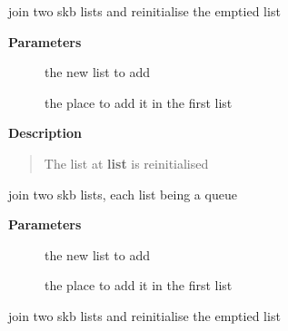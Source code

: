 \documentclass[a4paper,8pt,english]{sphinxmanual}
\begin{document}
\begin{fulllineitems}
\label{networking/kapi:c.skb_queue_splice_init}
join two skb lists and reinitialise the emptied list

\end{fulllineitems}


\textbf{Parameters}
\begin{description}
\item[{}] \leavevmode
the new list to add

\item[{}] \leavevmode
the place to add it in the first list

\end{description}

\textbf{Description}
\begin{quote}

The list at \textbf{list} is reinitialised
\end{quote}

\begin{fulllineitems}
\label{networking/kapi:c.skb_queue_splice_tail}
join two skb lists, each list being a queue

\end{fulllineitems}


\textbf{Parameters}
\begin{description}
\item[{}] \leavevmode
the new list to add

\item[{}] \leavevmode
the place to add it in the first list

\end{description}

\begin{fulllineitems}
\label{networking/kapi:c.skb_queue_splice_tail_init}
join two skb lists and reinitialise the emptied list

\end{fulllineitems}
\end{document}
